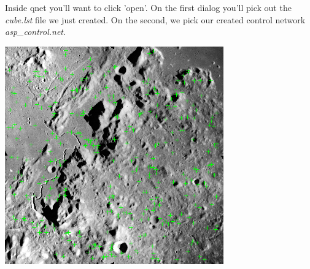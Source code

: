 Inside qnet you'll want to click 'open'. On the first dialog you'll
pick out the \emph{cube.lst} file we just created. On the second, we
pick our created control network \emph{asp\_control.net}.

\begin{center}
\includegraphics[height=3.7in]{images/cnettk_qnet_screen.png}
\end{center}
